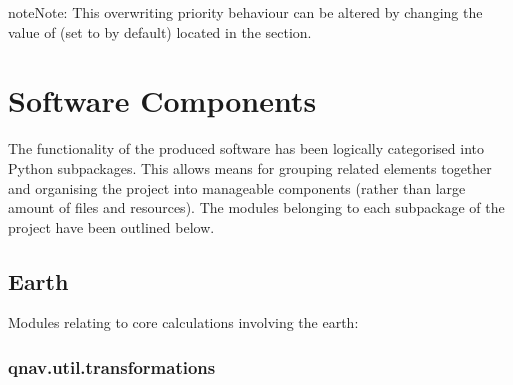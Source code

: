 \documentclass[letterpaper,10pt,english]{sphinxmanual}
\begin{document}
\begin{sphinxadmonition}{note}{Note:}
\sphinxAtStartPar
This overwriting priority behaviour can be altered by changing the value of 
(set to  by default) located in the  section.
\end{sphinxadmonition}

\sphinxstepscope


\section{Software Components}
\label{\detokenize{usage/packages:software-components}}\label{\detokenize{usage/packages::doc}}
\sphinxAtStartPar
The functionality of the produced software has been logically categorised into Python sub\sphinxhyphen{}packages. This allows means
for grouping related elements together and organising the project into manageable components (rather than large amount
of files and resources). The modules belonging to each sub\sphinxhyphen{}package of the project have been outlined below.


\subsection{Earth}
\label{\detokenize{usage/packages:earth}}
\sphinxAtStartPar
Modules relating to core calculations involving the earth:

\sphinxstepscope


\subsubsection{qnav.util.transformations}
\label{\detokenize{modules/util/transformations:module-qnav.util.transformations}}\label{\detokenize{modules/util/transformations:qnav-util-transformations}}\label{\detokenize{modules/util/transformations::doc}}
\end{document}
